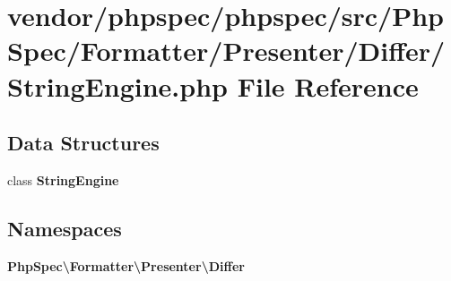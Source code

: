 \section{vendor/phpspec/phpspec/src/\+Php\+Spec/\+Formatter/\+Presenter/\+Differ/\+String\+Engine.php File Reference}
\label{_string_engine_8php}
\subsection*{Data Structures}
\begin{DoxyCompactItemize}
\item 
class {\bf String\+Engine}
\end{DoxyCompactItemize}
\subsection*{Namespaces}
\begin{DoxyCompactItemize}
\item 
 {\bf Php\+Spec\textbackslash{}\+Formatter\textbackslash{}\+Presenter\textbackslash{}\+Differ}
\end{DoxyCompactItemize}
